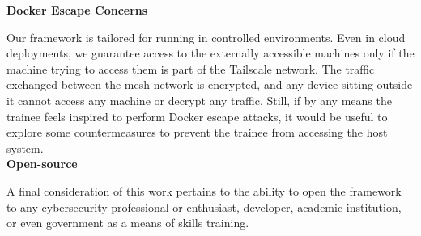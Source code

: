 \textbf{Docker Escape Concerns}

Our framework is tailored for running in controlled environments. Even in cloud deployments, we guarantee access to the externally accessible machines only if the machine trying to access them is part of the Tailscale network. The traffic exchanged between the mesh network is encrypted, and any device sitting outside it cannot access any machine or decrypt any traffic. Still, if by any means the trainee feels inspired to perform Docker escape attacks, it would be useful to explore some countermeasures to prevent the trainee from accessing the host system.\\

\textbf{Open-source}

A final consideration of this work pertains to the ability to open the framework to any cybersecurity professional or enthusiast, developer, academic institution, or even government as a means of skills training.

